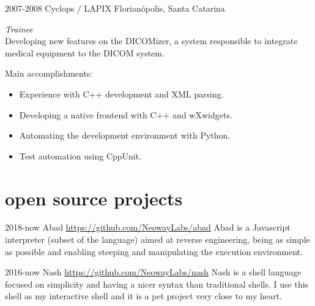 \documentclass[]{friggeri-cv} %
\begin{document}
\begin{entrylist}
\entry
{2007-2008}
{Cyclops / LAPIX}
{Florianópolis, Santa Catarina}
{\emph{Trainee} \\

Developing new features on the DICOMizer, a system responsible to integrate medical equipment to the DICOM system.

Main accomplishments:\\

\begin{itemize}
\item Experience with C++ development and XML parsing.
\item Developing a native frontend with C++ and wXwidgets.
\item Automating the development environment with Python.
\item Test automation using CppUnit.
\end{itemize}
}
\end{entrylist}


\pagebreak
\section{open source projects}


\begin{entrylist}
\entry
{2018-now}
{Abad}
{\href{https://github.com/NeowayLabs/abad}{https://github.com/NeowayLabs/abad}}
{
Abad is a Javascript interpreter (subset of the language) aimed at reverse
engineering, being as simple as possible and enabling steeping and manipulating
the execution environment.
}
\end{entrylist}

\begin{entrylist}
\entry
{2016-now}
{Nash}
{\href{https://github.com/NeowayLabs/nash}{https://github.com/NeowayLabs/nash}}
{
Nash is a shell language focused on simplicity and having a nicer syntax
than traditional shells. I use this shell as my interactive shell and it is
a pet project very close to my heart.
}
\end{entrylist}
\end{document}

